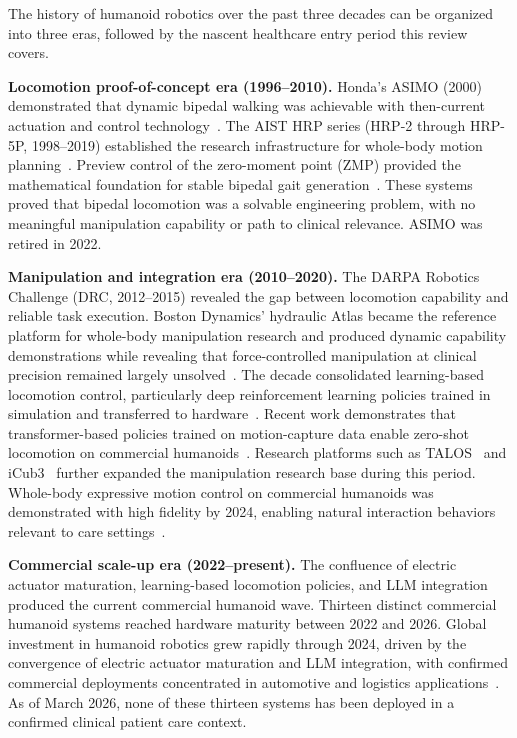 \documentclass[acmsmall]{acmart}
\begin{document}
The history of humanoid robotics over the past three decades can be organized
into three eras, followed by the nascent healthcare entry period this review
covers.

\textbf{Locomotion proof-of-concept era (1996--2010).} Honda's ASIMO (2000)
demonstrated that dynamic bipedal walking was achievable with then-current
actuation and control technology~\cite{sakagami2002asimo,cao2025humanoid}. The
AIST HRP series (HRP-2 through HRP-5P, 1998--2019) established the research
infrastructure for whole-body motion planning~\cite{kaneko2019hrp5p}. Preview
control of the zero-moment point (ZMP) provided the mathematical foundation for
stable bipedal gait generation~\cite{kajita2003biped}. These systems proved that bipedal locomotion was a
solvable engineering problem, with no meaningful manipulation capability or path
to clinical relevance. ASIMO was retired in 2022.

\textbf{Manipulation and integration era (2010--2020).} The DARPA Robotics
Challenge (DRC, 2012--2015) revealed the gap between locomotion capability and
reliable task execution. Boston Dynamics' hydraulic Atlas became the reference
platform for whole-body manipulation research and produced dynamic capability
demonstrations while revealing that force-controlled manipulation at clinical
precision remained largely unsolved~\cite{cao2025humanoid}. The decade
consolidated learning-based locomotion control, particularly deep reinforcement
learning policies trained in simulation and transferred to
hardware~\cite{duan2022simtoreal,radosavovic2024realworld}. Recent work
demonstrates that transformer-based policies trained on motion-capture data
enable zero-shot locomotion on commercial
humanoids~\cite{radosavovic2024humanoid}. Research platforms such as
TALOS~\cite{stasse2017talos} and iCub3~\cite{dafarra2024icub3} further expanded
the manipulation research base during this period.
Whole-body expressive motion control on commercial humanoids was demonstrated with high fidelity by 2024, enabling
natural interaction behaviors relevant to care
settings~\cite{cheng2024expressive}.

\textbf{Commercial scale-up era (2022--present).} The confluence of electric
actuator maturation, learning-based locomotion policies, and LLM integration
produced the current commercial humanoid wave. Thirteen distinct commercial
humanoid systems reached hardware maturity between 2022 and 2026. Global
investment in humanoid robotics grew rapidly through 2024, driven by the
convergence of electric actuator maturation and LLM integration, with confirmed
commercial deployments concentrated in automotive and logistics
applications~\cite{goldmansachs2024humanoid,ifr2025humanoid}.
As
of March 2026, none of these thirteen systems has been deployed in a confirmed
clinical patient care context.
\end{document}
